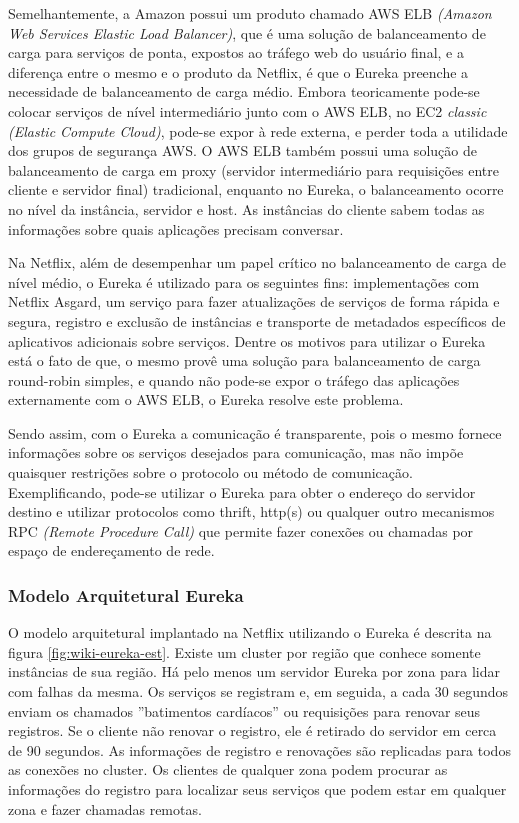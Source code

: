\documentclass[journal]{IEEEtran}
\begin{document}
Semelhantemente, a Amazon possui um produto chamado AWS ELB \emph{(Amazon Web Services Elastic Load Balancer)}, que é uma solução de balanceamento de carga para serviços de ponta, expostos ao tráfego web do usuário final, e a diferença entre o mesmo e o produto da Netflix, é que o Eureka preenche a necessidade de balanceamento de carga médio. Embora teoricamente pode-se colocar serviços de nível intermediário junto com o AWS ELB, no EC2 \emph{classic} \emph{(Elastic Compute Cloud)}, pode-se expor à rede externa, e perder toda a utilidade dos grupos de segurança AWS. O AWS ELB também possui uma solução de balanceamento de carga em proxy (servidor intermediário para requisições entre cliente e servidor final) tradicional, enquanto no Eureka, o balanceamento ocorre no nível da instância, servidor e host. As instâncias do cliente sabem todas as informações sobre quais aplicações precisam conversar.

Na Netflix, além de desempenhar um papel crítico no balanceamento de carga de nível médio, o Eureka é utilizado para os seguintes fins: implementações com Netflix Asgard, um serviço para fazer atualizações de serviços de forma rápida e segura, registro e exclusão de instâncias e transporte de metadados específicos de aplicativos adicionais sobre serviços. Dentre os motivos para utilizar o Eureka está o fato de que, o mesmo provê uma solução para balanceamento de carga round-robin simples, e quando não pode-se expor o tráfego das aplicações externamente com o AWS ELB, o Eureka resolve este problema.

Sendo assim, com o Eureka a comunicação é transparente, pois o mesmo fornece informações sobre os serviços desejados para comunicação, mas não impõe quaisquer restrições sobre o protocolo ou método de comunicação. Exemplificando, pode-se utilizar o Eureka para obter o endereço do servidor destino e utilizar protocolos como thrift, http(s) ou qualquer outro mecanismos RPC \emph{(Remote Procedure Call)} que permite fazer conexões ou chamadas por espaço de endereçamento de rede. 

\subsubsection{Modelo Arquitetural Eureka}
O modelo arquitetural implantado na Netflix utilizando o Eureka é descrita na figura \ref{fig:wiki-eureka-est}. Existe um cluster por região que conhece somente instâncias de sua região. Há pelo menos um servidor Eureka por zona para lidar com falhas da mesma. Os serviços se registram e, em seguida, a cada 30 segundos enviam os chamados ''batimentos cardíacos'' ou requisições para renovar seus registros. Se o cliente não renovar o registro, ele é retirado do servidor em cerca de 90 segundos. As informações de registro e renovações são replicadas para todos as conexões no cluster. Os clientes de qualquer zona podem procurar as informações do registro para localizar seus serviços que podem estar em qualquer zona e fazer chamadas remotas.
\end{document}
